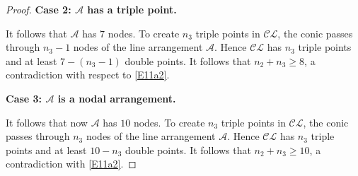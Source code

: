 \documentclass[12pt]{amsart}
\theoremstyle{plain}
\theoremstyle{definition}
\numberwithin{equation}{section}
\newcommand{\A}{{\mathcal A}}
\begin{document}
\begin{proof}
\medskip

{\bf Case 2: $\mathcal{A}$  has a triple point.}

\medskip

It follows that $\mathcal{A}$ has $7$ nodes. To create $n_3$ triple points in $\mathcal{CL}$, the conic passes through $n_3-1$ nodes of the line arrangement $\A$. Hence $\mathcal{CL}$ has $n_3$ triple points and at least $7-(n_3-1)$ double points. It follows that $n_2+n_3 \geq 8$, a contradiction with respect to \eqref{E11a2}.

\medskip

{\bf Case 3: $\mathcal{A}$ is a nodal arrangement.}

\medskip

It follows that now  $\mathcal{A}$ has $10$ nodes. To create $n_3$ triple points in $\mathcal{CL}$, the conic passes through $n_3$ nodes of the line arrangement $\mathcal{A}$. Hence $\mathcal{CL}$ has $n_3$ triple points and at least $10-n_3$ double points. It follows that $n_2+n_3 \geq 10$, a contradiction with \eqref{E11a2}.

\end{proof}
\end{document}
